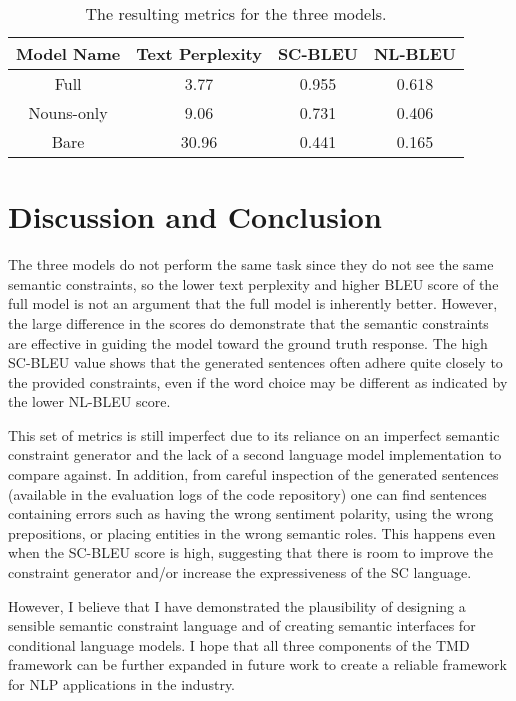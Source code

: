 \documentclass{article}
\numberwithin{equation}{section}
\begin{document}
\begin{table}
\begin{center}
{\renewcommand{\arraystretch}{1.2}
\begin{tabular}{c|ccc}
\textbf{Model Name} & \textbf{Text Perplexity} & \textbf{SC-BLEU} & \textbf{NL-BLEU} \\
\hline Full & 3.77 & 0.955 & 0.618 \\
Nouns-only & 9.06 & 0.731 & 0.406 \\
Bare & 30.96 & 0.441 & 0.165 \\
\end{tabular}}
\end{center}
\caption{The resulting metrics for the three models.} \label{metrics_table}
\end{table}

\section{Discussion and Conclusion}

The three models do not perform the same task since they do not see the same semantic constraints, so the lower text perplexity and higher BLEU score of the full model is not an argument that the full model is inherently better. However, the large difference in the scores do demonstrate that the semantic constraints are effective in guiding the model toward the ground truth response. The high SC-BLEU value shows that the generated sentences often adhere quite closely to the provided constraints, even if the word choice may be different as indicated by the lower NL-BLEU score.

This set of metrics is still imperfect due to its reliance on an imperfect semantic constraint generator and the lack of a second language model implementation to compare against. In addition, from careful inspection of the generated sentences (available in the evaluation logs of the code repository) one can find sentences containing errors such as having the wrong sentiment polarity, using the wrong prepositions, or placing entities in the wrong semantic roles. This happens even when the SC-BLEU score is high, suggesting that there is room to improve the constraint generator and/or increase the expressiveness of the SC language.

However, I believe that I have demonstrated the plausibility of designing a sensible semantic constraint language and of creating semantic interfaces for conditional language models. I hope that all three components of the TMD framework can be further expanded in future work to create a reliable framework for NLP applications in the industry.
\end{document}
